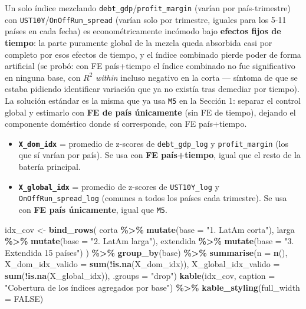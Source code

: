 \documentclass[
]{article}
\newenvironment{Shaded}{\begin{snugshade}}{\end{snugshade}}
\newcommand{\AttributeTok}[1]{\textcolor[rgb]{0.13,0.29,0.53}{#1}}
\newcommand{\ConstantTok}[1]{\textcolor[rgb]{0.56,0.35,0.01}{#1}}
\newcommand{\FunctionTok}[1]{\textcolor[rgb]{0.13,0.29,0.53}{\textbf{#1}}}
\newcommand{\NormalTok}[1]{#1}
\newcommand{\OtherTok}[1]{\textcolor[rgb]{0.56,0.35,0.01}{#1}}
\newcommand{\SpecialCharTok}[1]{\textcolor[rgb]{0.81,0.36,0.00}{\textbf{#1}}}
\newcommand{\StringTok}[1]{\textcolor[rgb]{0.31,0.60,0.02}{#1}}
\providecommand{\tightlist}{%
  \setlength{\itemsep}{0pt}\setlength{\parskip}{0pt}}
\begin{document}
Un solo índice mezclando \texttt{debt\_gdp}/\texttt{profit\_margin}
(varían por país-trimestre) con
\texttt{UST10Y}/\texttt{OnOffRun\_spread} (varían solo por trimestre,
iguales para los 5-11 países en cada fecha) es econométricamente
incómodo bajo \textbf{efectos fijos de tiempo}: la parte puramente
global de la mezcla queda absorbida casi por completo por esos efectos
de tiempo, y el índice combinado pierde poder de forma artificial (se
probó: con FE país+tiempo el índice combinado no fue significativo en
ninguna base, con \(R^2\) \emph{within} incluso negativo en la corta ---
síntoma de que se estaba pidiendo identificar variación que ya no
existía tras demediar por tiempo). La solución estándar es la misma que
ya usa \texttt{M5} en la Sección 1: separar el control global y
estimarlo con \textbf{FE de país únicamente} (sin FE de tiempo), dejando
el componente doméstico donde sí corresponde, con FE país+tiempo.

\begin{itemize}
\tightlist
\item
  \textbf{\texttt{X\_dom\_idx}} = promedio de z-scores de
  \texttt{debt\_gdp\_log} y \texttt{profit\_margin} (los que sí varían
  por país). Se usa con \textbf{FE país+tiempo}, igual que el resto de
  la batería principal.
\item
  \textbf{\texttt{X\_global\_idx}} = promedio de z-scores de
  \texttt{UST10Y\_log} y \texttt{OnOffRun\_spread\_log} (comunes a todos
  los países cada trimestre). Se usa con \textbf{FE país únicamente},
  igual que \texttt{M5}.
\end{itemize}

\begin{Shaded}
\begin{Highlighting}[]
\NormalTok{idx\_cov }\OtherTok{\textless{}{-}} \FunctionTok{bind\_rows}\NormalTok{(}
\NormalTok{  corta     }\SpecialCharTok{\%\textgreater{}\%} \FunctionTok{mutate}\NormalTok{(}\AttributeTok{base =} \StringTok{"1. LatAm corta"}\NormalTok{),}
\NormalTok{  larga     }\SpecialCharTok{\%\textgreater{}\%} \FunctionTok{mutate}\NormalTok{(}\AttributeTok{base =} \StringTok{"2. LatAm larga"}\NormalTok{),}
\NormalTok{  extendida }\SpecialCharTok{\%\textgreater{}\%} \FunctionTok{mutate}\NormalTok{(}\AttributeTok{base =} \StringTok{"3. Extendida 15 países"}\NormalTok{)}
\NormalTok{) }\SpecialCharTok{\%\textgreater{}\%}
  \FunctionTok{group\_by}\NormalTok{(base) }\SpecialCharTok{\%\textgreater{}\%}
  \FunctionTok{summarise}\NormalTok{(}\AttributeTok{n =} \FunctionTok{n}\NormalTok{(),}
            \AttributeTok{X\_dom\_idx\_valido =} \FunctionTok{sum}\NormalTok{(}\SpecialCharTok{!}\FunctionTok{is.na}\NormalTok{(X\_dom\_idx)),}
            \AttributeTok{X\_global\_idx\_valido =} \FunctionTok{sum}\NormalTok{(}\SpecialCharTok{!}\FunctionTok{is.na}\NormalTok{(X\_global\_idx)), }\AttributeTok{.groups =} \StringTok{"drop"}\NormalTok{)}
\FunctionTok{kable}\NormalTok{(idx\_cov, }\AttributeTok{caption =} \StringTok{"Cobertura de los índices agregados por base"}\NormalTok{) }\SpecialCharTok{\%\textgreater{}\%}
  \FunctionTok{kable\_styling}\NormalTok{(}\AttributeTok{full\_width =} \ConstantTok{FALSE}\NormalTok{)}
\end{Highlighting}
\end{Shaded}
\end{document}
